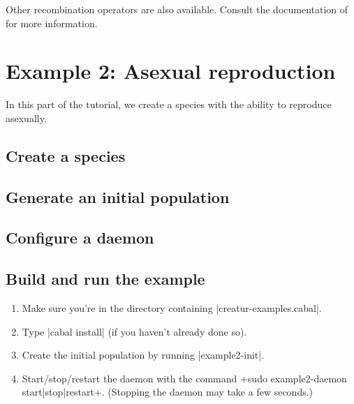 \documentclass[a4paper,10pt]{article}
\begin{document}
Other recombination operators are also available.
Consult the documentation of 
for more information.

\section{Example 2: Asexual reproduction}
\label{sec:plant}

In this part of the tutorial, we create a species with the
ability to reproduce asexually.

\subsection{Create a species}
\label{sec:species2}



\subsection{Generate an initial population}
\label{sec:pop2}



\subsection{Configure a daemon}
\label{sec:daemon2}



\subsection{Build and run the example}
\label{sec:run2}

\begin{enumerate}
\item Make sure you're in the directory containing |creatur-examples.cabal|.
\item Type |cabal install| (if you haven't already done so).
\item Create the initial population by running |example2-init|.
\item Start/stop/restart the daemon with the command
\UndefineShortVerb{\|}
\DefineShortVerb{\+}
+sudo example2-daemon start|stop|restart+.
\UndefineShortVerb{\+}
\DefineShortVerb{\|}
(Stopping the daemon may take a few seconds.)
\end{enumerate}
\end{document}
